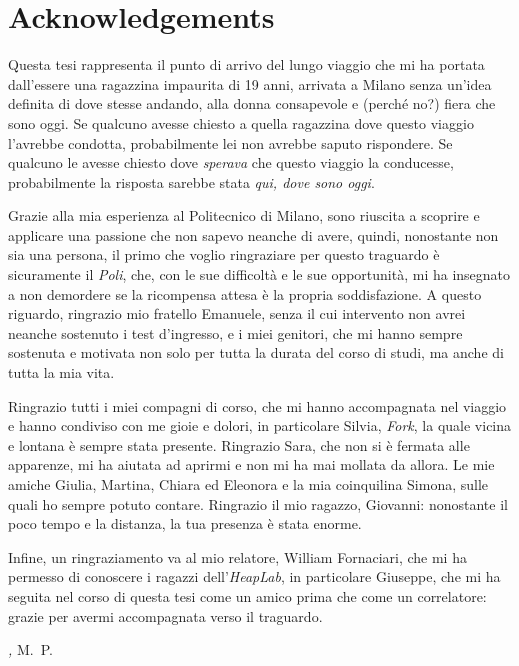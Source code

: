 %
%
\cleardoublepage
%
%
%
\chapter*{Acknowledgements}
%
Questa tesi rappresenta il punto di arrivo del lungo viaggio che mi ha portata dall'essere una ragazzina impaurita di 19 anni, arrivata a Milano senza un'idea definita di dove stesse andando, alla donna consapevole e (perché no?) fiera che sono oggi. Se qualcuno avesse chiesto a quella ragazzina dove questo viaggio l'avrebbe condotta, probabilmente lei non avrebbe saputo rispondere. Se qualcuno le avesse chiesto dove \emph{sperava} che questo viaggio la conducesse, probabilmente la risposta sarebbe stata \emph{qui, dove sono oggi}. 

Grazie alla mia esperienza al Politecnico di Milano, sono riuscita a scoprire e applicare una passione che non sapevo neanche di avere, quindi, nonostante non sia una persona, il primo che voglio ringraziare per questo traguardo è sicuramente il \emph{Poli}, che, con le sue difficoltà e le sue opportunità, mi ha insegnato a non demordere se la ricompensa attesa è la propria soddisfazione. A questo riguardo, ringrazio mio fratello Emanuele, senza il cui intervento non avrei neanche sostenuto i test d'ingresso, e i miei genitori, che mi hanno sempre sostenuta e motivata non solo per tutta la durata del corso di studi, ma anche di tutta la mia vita.

Ringrazio tutti i miei compagni di corso, che mi hanno accompagnata nel viaggio e hanno condiviso con me gioie e dolori, in particolare Silvia, \emph{Fork}, la quale vicina e lontana è sempre stata presente. Ringrazio Sara, che non si è fermata alle apparenze, mi ha aiutata ad aprirmi e non mi ha mai mollata da allora. Le mie amiche Giulia, Martina, Chiara ed Eleonora e la mia coinquilina Simona, sulle quali ho sempre potuto contare. Ringrazio il mio ragazzo, Giovanni: nonostante il poco tempo e la distanza, la tua presenza è stata enorme.

Infine, un ringraziamento va al mio relatore, William Fornaciari, che mi ha permesso di conoscere i ragazzi dell'\emph{HeapLab}, in particolare Giuseppe, che mi ha seguita nel corso di questa tesi come un amico prima che come un correlatore: grazie per avermi accompagnata verso il traguardo.
\medskip



\bigskip
 
\noindent\textit{\myLocation, \myTime}
\hfill M.~P.
%
